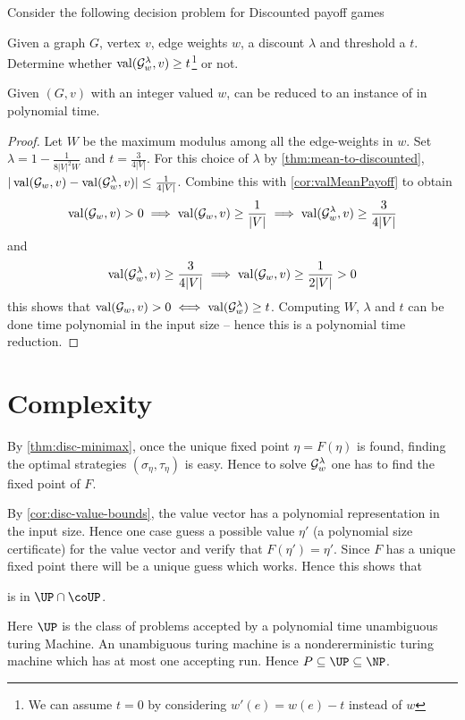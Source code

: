 Consider the following decision problem for Discounted payoff games
\begin{decision}[DISC]
    \label{dec:disc}
    Given a graph $G$, vertex $v$, edge weights $w$, a discount $\lambda$ and threshold a $t$. Determine whether $\operatorname{val}(\mathcal{G}^\lambda_w,v) \geq t$\footnote{We can assume $t=0$ by considering $w'(e)=w(e)-t$ instead of $w$} or not.
\end{decision}

\begin{corollary}
    \label{cor:mean2disc}
    Given $(G,v)$ with an integer valued $w$,  can be reduced to an instance of  in polynomial time.
\end{corollary}
\begin{proof}
    Let $W$ be the maximum modulus among all the edge-weights in $w$. Set $\lambda=1 -\frac{1}{8|V|^2W}$ and $t=\frac{3}{4|V|}$. For this choice of $\lambda$ by \autoref{thm:mean-to-discounted}, $|\operatorname{val}(\mathcal{G}_w, v) - \operatorname{val}(\mathcal{G}^\lambda_w,v)| \leq \frac{1}{4|V|}$. Combine this with \autoref{cor:valMeanPayoff} to obtain
    \[
        \operatorname{val}(\mathcal{G}_w,v) > 0 \implies \operatorname{val}(\mathcal{G}_w,v) \geq \frac{1}{|V|} \implies \operatorname{val}(\mathcal{G}^\lambda_w,v) \geq \frac{3}{4|V|}
    \]
    and
    \[
        \operatorname{val}(\mathcal{G}^\lambda_w,v) \geq \frac{3}{4|V|} \implies \operatorname{val}(\mathcal{G}_w,v) \geq \frac{1}{2|V|} > 0
    \]
    this shows that $\operatorname{val}(\mathcal{G}_w,v) > 0 \iff \operatorname{val}(\mathcal{G}^\lambda_w) \geq t$. Computing $W$, $\lambda$ and $t$ can be done time polynomial in the input size -- hence this is a polynomial time reduction.
\end{proof}

\section{Complexity}

By \autoref{thm:disc-minimax}, once the unique fixed point $\eta=F(\eta)$ is found, finding the optimal strategies $(\sigma_\eta,\tau_\eta)$ is easy. Hence to solve $\mathcal{G}^\lambda_w$ one  has to find the fixed point of $F$.

By \autoref{cor:disc-value-bounds}, the value vector has a polynomial representation in the input size. Hence one case guess a possible value $\eta'$ (a polynomial size certificate) for the value vector and verify that $F(\eta')=\eta'$. Since $F$ has a unique fixed point there will be a unique guess which works. Hence this shows that

\begin{theorem}
    \label{thm:disc-in-up}
     is in $\UP \cap \coUP$.
\end{theorem}
Here $\UP$ is the class of problems accepted by a polynomial time unambiguous turing Machine. An unambiguous turing machine is a nondererministic turing machine which has at most one accepting run. Hence $P \subseteq \UP \subseteq \NP$.

